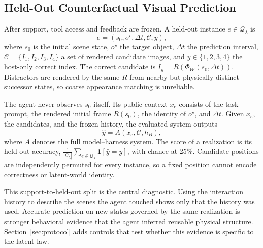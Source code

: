 \subsection{Held-Out Counterfactual Visual Prediction}

After support, tool access and feedback are frozen. A held-out instance $e\in\mathcal{Q}_\lambda$ is
\begin{equation}
  e = (s_0, o^\star, \Delta t, \mathcal{C}, y),
  \label{eq:prediction-instance}
\end{equation}
where $s_0$ is the initial scene state, $o^\star$ the target object, $\Delta t$ the prediction interval, $\mathcal{C}=\{I_1,I_2,I_3,I_4\}$ a set of rendered candidate images, and $y\in\{1,2,3,4\}$ the host-only correct index. The correct candidate is $I_y=R(\Phi_{\mathcal{W}}(s_0,\Delta t))$. Distractors are rendered by the same $R$ from nearby but physically distinct successor states, so coarse appearance matching is unreliable.

The agent never observes $s_0$ itself. Its public context $x_e$ consists of the task prompt, the rendered initial frame $R(s_0)$, the identity of $o^\star$, and $\Delta t$. Given $x_e$, the candidates, and the frozen history, the evaluated system outputs
\begin{equation}
  \hat{y} = A(x_e, \mathcal{C}, h_B),
  \label{eq:agent-objective}
\end{equation}
where $A$ denotes the full model--harness system. The score of a realization is its held-out accuracy, $\frac{1}{|\mathcal{Q}_\lambda|}\sum_{e\in\mathcal{Q}_\lambda}\mathbf{1}[\hat{y}=y]$, with chance at 25\%. Candidate positions are independently permuted for every instance, so a fixed position cannot encode correctness or latent-world identity. 

This support-to-held-out split is the central diagnostic. Using the interaction history to describe the scenes the agent touched shows only that the history was used. Accurate prediction on new states governed by the same realization is stronger behavioral evidence that the agent inferred reusable physical structure. Section~\ref{sec:protocol} adds controls that test whether this evidence is specific to the latent law.
